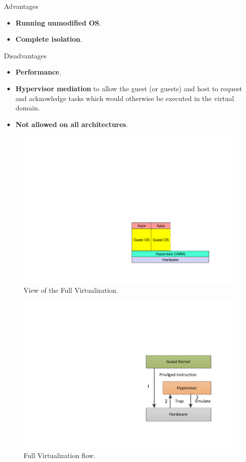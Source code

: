 \highspace
\begin{flushleft}
	\textcolor{Green3}{ Advantages}
\end{flushleft}
\begin{itemize}
	\item \textbf{Running unmodified OS}.
	\item \textbf{Complete isolation}.
\end{itemize}

\begin{flushleft}
	\textcolor{Red2}{ Disadvantages}
\end{flushleft}
\begin{itemize}
	\item \textbf{Performance}.
	\item \textbf{Hypervisor mediation} to allow the guest (or guests) and host to request and acknowledge tasks which would otherwise be executed in the virtual domain.
	\item \textbf{Not allowed on all architectures}.
\end{itemize}

\begin{figure}[!htp]
	\centering
	\includegraphics[width=.6\textwidth]{img/full-virtualization-1.pdf}
	\caption{View of the Full Virtualization.}
\end{figure}

\newpage

\begin{figure}[!htp]
	\centering
	\includegraphics[width=.4\textwidth]{img/full-virtualization-2.pdf}
	\caption{Full Virtualization flow.}
\end{figure}

